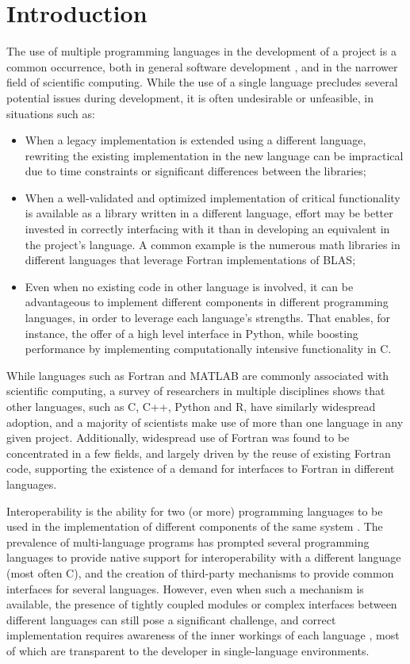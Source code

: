 \chapter{Introduction}
\label{chapter:introduction}

The use of multiple programming languages in the development of a project is a common occurrence, both in general software development \cite{mayer2017multi}, and in the narrower field of scientific computing. While the use of a single language precludes several potential issues during development, it is often undesirable or unfeasible, in situations such as:
\begin{itemize}
	\item When a legacy implementation is extended using a different language, rewriting the existing implementation in the new language can be impractical due to time constraints or significant differences between the libraries;
	\item When a well-validated and optimized implementation of critical functionality is available as a library written in a different language, effort may be better invested in correctly interfacing with it than in developing an equivalent in the project's language. A common example is the numerous math libraries in different languages that leverage Fortran implementations of BLAS;
	\item Even when no existing code in other language is involved, it can be advantageous to implement different components in different programming languages, in order to leverage each language's strengths. That enables, for instance, the offer of a high level interface in Python, while boosting performance by implementing computationally intensive functionality in C.
\end{itemize}

While languages such as Fortran and MATLAB are commonly associated with scientific computing, a survey \cite{prabhu2011survey} of researchers in multiple disciplines shows that other languages, such as C, C++, Python and R, have similarly widespread adoption, and a majority of scientists make use of more than one language in any given project. Additionally, widespread use of Fortran was found to be concentrated in a few fields, and largely driven by the reuse of existing Fortran code, supporting the existence of a demand for interfaces to Fortran in different languages.

Interoperability is the ability for two (or more) programming languages to be used in the implementation of different components of the same system \cite{malone2014interoperability}. The prevalence of multi-language programs has prompted several programming languages to provide native support for interoperability with a different language (most often C), and the creation of third-party mechanisms to provide common interfaces for several languages. However, even when such a mechanism is available, the presence of tightly coupled modules or complex interfaces between different languages can still pose a significant challenge, and correct implementation requires awareness of the inner workings of each language \cite{chisnall2013challenge}, most of which are transparent to the developer in single-language environments.

